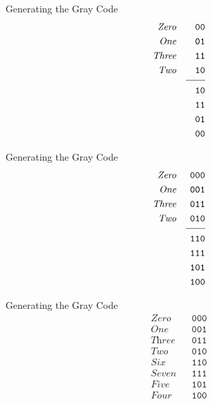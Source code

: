 \documentclass[aspectratio=169]{beamer}
\begin{document}
\begin{frame}{Generating the Gray Code}
    \begin{align*}
        \textit{Zero}& &\texttt{00}  \\
        \textit{One}&  &\texttt{01}  \\
        \textit{Three} &  &\texttt{11}  \\
        \textit{Two} &  &\texttt{10}  \\[-3\jot]
                    &   &\underline{\hspace{20pt}}\\
                        & &\texttt{10}  \\
                        &  &\texttt{11}  \\
                        &  &\texttt{01}  \\
                        &  &\texttt{00}  \\
    \end{align*}
\end{frame}

\begin{frame}{Generating the Gray Code}
    \begin{align*}
        \textit{Zero}& &\texttt{000}  \\
        \textit{One}&  &\texttt{001}  \\
        \textit{Three} &  &\texttt{011}  \\
        \textit{Two} &  &\texttt{010}  \\[-3\jot]
                    &   &\underline{\hspace{20pt}}\\
                        & &\texttt{110}  \\
                        &  &\texttt{111}  \\
                        &  &\texttt{101}  \\
                        &  &\texttt{100}  \\
    \end{align*}
\end{frame}

\begin{frame}{Generating the Gray Code}
    \begin{align*}
        \textit{Zero}& &\texttt{000}  \\
        \textit{One}&  &\texttt{001}  \\
        \textit{Three} &  &\texttt{011}  \\
        \textit{Two} &  &\texttt{010}  \\
        \textit{Six}    & &\texttt{110}  \\
        \textit{Seven}      &  &\texttt{111}  \\
        \textit{Five}    &  &\texttt{101}  \\
        \textit{Four}    &  &\texttt{100}  \\
    \end{align*}
\end{frame}
\end{document}

